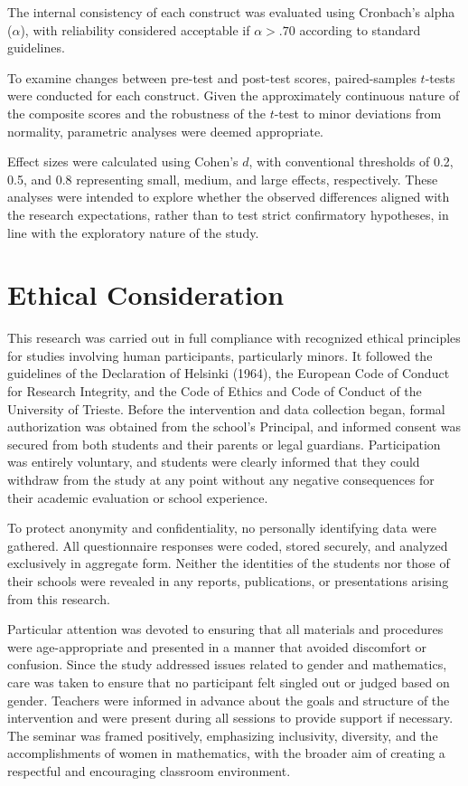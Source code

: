 The internal consistency of each construct was evaluated using Cronbach's alpha ($\alpha$), with reliability considered acceptable if $\alpha > .70$ according to standard guidelines.

To examine changes between pre-test and post-test scores, paired-samples $t$-tests were conducted for each construct. Given the approximately continuous nature of the composite scores and the robustness of the $t$-test to minor deviations from normality, parametric analyses were deemed appropriate. 

Effect sizes were calculated using Cohen's $d$, with conventional thresholds of 0.2, 0.5, and 0.8 representing small, medium, and large effects, respectively. These analyses were intended to explore whether the observed differences aligned with the research expectations, rather than to test strict confirmatory hypotheses, in line with the exploratory nature of the study.


\section{Ethical Consideration}
This research was carried out in full compliance with recognized ethical principles for studies involving human participants, particularly minors. It followed the guidelines of the Declaration of Helsinki (1964), the European Code of Conduct for Research Integrity, and the Code of Ethics and Code of Conduct of the University of Trieste. Before the intervention and data collection began, formal authorization was obtained from the school's Principal, and informed consent was secured from both students and their parents or legal guardians. Participation was entirely voluntary, and students were clearly informed that they could withdraw from the study at any point without any negative consequences for their academic evaluation or school experience.

To protect anonymity and confidentiality, no personally identifying data were gathered. All questionnaire responses were coded, stored securely, and analyzed exclusively in aggregate form. Neither the identities of the students nor those of their schools were revealed in any reports, publications, or presentations arising from this research.

Particular attention was devoted to ensuring that all materials and procedures were age-appropriate and presented in a manner that avoided discomfort or confusion. Since the study addressed issues related to gender and mathematics, care was taken to ensure that no participant felt singled out or judged based on gender. Teachers were informed in advance about the goals and structure of the intervention and were present during all sessions to provide support if necessary. The seminar was framed positively, emphasizing inclusivity, diversity, and the accomplishments of women in mathematics, with the broader aim of creating a respectful and encouraging classroom environment.